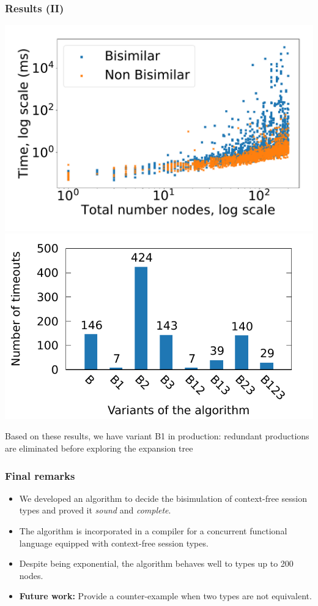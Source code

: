 \documentclass[10pt]{beamer}
\begin{document}
\begin{frame}
  \frametitle{Results (II)}
  \includegraphics[width=.55\textwidth]{img/nodes_time.pdf}%
  \includegraphics[width=.55\textwidth]{img/timeouts.pdf}

  Based on these results, we have variant B1 in production: redundant
  productions are eliminated before exploring the expansion tree
\end{frame}

\begin{frame}
  \frametitle{Final remarks}

  \begin{itemize}
  \item We developed an algorithm to decide the bisimulation of context-free
    session types and proved it \emph{sound} and \emph{complete}.
  \item The algorithm is incorporated in a compiler for a concurrent functional
    language equipped with context-free session types.
    
  \item Despite being exponential, the algorithm behaves well to types up to 200 nodes.
  \item \textbf{Future work:} Provide a counter-example when two types are not equivalent.
  \end{itemize}
 \end{frame}




 
\end{document}
